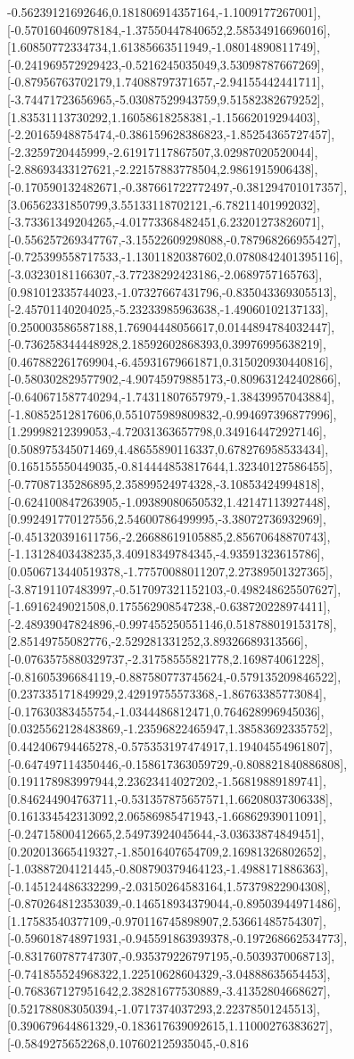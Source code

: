 \documentclass{article}
\begin{document}
-0.56239121692646,0.181806914357164,-1.1009177267001],[-0.570160460978184,-1.37550447840652,2.58534916696016],[1.60850772334734,1.61385663511949,-1.08014890811749],[-0.241969572929423,-0.5216245035049,3.53098787667269],[-0.87956763702179,1.74088797371657,-2.94155442441711],[-3.74471723656965,-5.03087529943759,9.51582382679252],[1.83531113730292,1.16058618258381,-1.15662019294403],[-2.20165948875474,-0.386159628386823,-1.85254365727457],[-2.3259720445999,-2.61917117867507,3.02987020520044],[-2.88693433127621,-2.22157883778504,2.9861915906438],[-0.170590132482671,-0.387661722772497,-0.381294701017357],[3.06562331850799,3.55133118702121,-6.78211401992032],[-3.73361349204265,-4.01773368482451,6.23201273826071],[-0.556257269347767,-3.15522609298088,-0.787968266955427],[-0.725399558717533,-1.13011820387602,0.0780842401395116],[-3.03230181166307,-3.77238292423186,-2.0689757165763],[0.981012335744023,-1.07327667431796,-0.835043369305513],[-2.45701140204025,-5.23233985963638,-1.49060102137133],[0.250003586587188,1.76904448056617,0.0144894784032447],[-0.736258344448928,2.18592602868393,0.39976995638219],[0.467882261769904,-6.45931679661871,0.315020930440816],[-0.580302829577902,-4.90745979885173,-0.809631242402866],[-0.640671587740294,-1.74311807657979,-1.38439957043884],[-1.80852512817606,0.551075989809832,-0.994697396877996],[1.29998212399053,-4.72031363657798,0.349164472927146],[0.508975345071469,4.48655890116337,0.678276958533434],[0.165155550449035,-0.814444853817644,1.32340127586455],[-0.77087135286895,2.35899524974328,-3.10853424994818],[-0.624100847263905,-1.09389080650532,1.42147113927448],[0.992491770127556,2.54600786499995,-3.38072736932969],[-0.451320391611756,-2.26688619105885,2.85670648870743],[-1.13128403438235,3.40918349784345,-4.93591323615786],[0.0506713440519378,-1.77570088011207,2.27389501327365],[-3.87191107483997,-0.517097321152103,-0.498248625507627],[-1.6916249021508,0.175562908547238,-0.638720228974411],[-2.48939047824896,-0.997455250551146,0.518788019153178],[2.85149755082776,-2.529281331252,3.89326689313566],[-0.0763575880329737,-2.31758555821778,2.169874061228],[-0.81605396684119,-0.887580773745624,-0.579135209846522],[0.237335171849929,2.42919755573368,-1.86763385773084],[-0.17630383455754,-1.0344486812471,0.764628996945036],[0.0325562128483869,-1.23596822465947,1.38583692335752],[0.442406794465278,-0.575353197474917,1.19404554961807],[-0.647497114350446,-0.158617363059729,-0.808821840886808],[0.191178983997944,2.23623414027202,-1.56819889189741],[0.846244904763711,-0.531357875657571,1.66208037306338],[0.161334542313092,2.06586985471943,-1.66862939011091],[-0.24715800412665,2.54973924045644,-3.03633874849451],[0.202013665419327,-1.85016407654709,2.16981326802652],[-1.03887204121445,-0.808790379464123,-1.4988171886363],[-0.145124486332299,-2.03150264583164,1.57379822904308],[-0.870264812353039,-0.146518934379044,-0.89503944971486],[1.17583540377109,-0.970116745898907,2.53661485754307],[-0.596018748971931,-0.945591863939378,-0.197268662534773],[-0.831760787747307,-0.935379226797195,-0.5039370068713],[-0.741855524968322,1.22510628604329,-3.04888635654453],[-0.768367127951642,2.38281677530889,-3.41352804668627],[0.521788083050394,-1.0717374037293,2.22378501245513],[0.390679644861329,-0.183617639092615,1.11000276383627],[-0.5849275652268,0.107602125935045,-0.816
\end{document}

